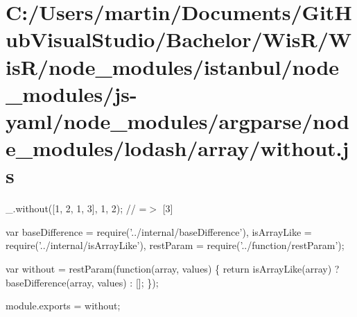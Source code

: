 \hypertarget{_c_1_2_users_2martin_2_documents_2_git_hub_visual_studio_2_bachelor_2_wis_r_2_wis_r_2node_module615011524b7e5fdeb8a642a0dd7d4d3a}{}\section{C\+:/\+Users/martin/\+Documents/\+Git\+Hub\+Visual\+Studio/\+Bachelor/\+Wis\+R/\+Wis\+R/node\+\_\+modules/istanbul/node\+\_\+modules/js-\/yaml/node\+\_\+modules/argparse/node\+\_\+modules/lodash/array/without.\+js}
\+\_\+.\+without(\mbox{[}1, 2, 1, 3\mbox{]}, 1, 2); // =$>$ \mbox{[}3\mbox{]}


\begin{DoxyCodeInclude}
var baseDifference = require(\textcolor{stringliteral}{'../internal/baseDifference'}),
    isArrayLike = require(\textcolor{stringliteral}{'../internal/isArrayLike'}),
    restParam = require(\textcolor{stringliteral}{'../function/restParam'});

var without = restParam(\textcolor{keyword}{function}(array, values) \{
  \textcolor{keywordflow}{return} isArrayLike(array)
    ? baseDifference(array, values)
    : [];
\});

module.exports = without;
\end{DoxyCodeInclude}
 